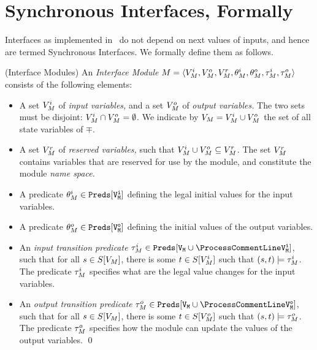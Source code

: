 \section{Synchronous Interfaces, Formally}
Interfaces as implemented in \chai \ do not depend on next values
of inputs, and hence are termed Synchronous Interfaces. We
formally define them as follows.

\begin{defi}{(Interface Modules)}
An {\em Interface Module\/} $M = \langle {V}^i_M, { V}^o_M,
{ V}^r_M, \theta^i_M, \theta^o_M, \tau^i_M, \tau^o_M \rangle$
consists of the following elements:

\begin{itemize}

\item A set ${ V}^i_M$ of {\em input variables,} and a set
${ V}^o_M$ of {\em output variables.} The two sets must be
disjoint: ${ V}^i_M \cap {V}^o_M = \emptyset$. We indicate
by ${ V}_M = { V}^i_M \cup {V}^o_M$ the set of all state
variables of $\mp$.

\item A set ${ V}^r_M$ of {\em reserved variables,} such that
${ V}^i_M \cup {V}^o_M \subseteq {V}^r_M$. The set
${ V}^r_M$ contains variables that are reserved for use by the
module, and constitute the module {\em name space.}

\item A predicate $\theta^i_M \in \tt{Preds}[{ V}^i_M]$ defining the
legal initial values for the input variables.

\item A predicate $\theta^o_M \in \tt{Preds}[{ V}^o_M]$ defining the
initial values of the output variables.

\item An {\em input transition predicate\/} $\itrans_\mp \in
\Preds[\vars_\mp \union \nx{\ivars_\mp}]$, such that for all $s
\in {S}[{ V}_M]$, there is some $t \in {S}[{ V}^i_M]$
such that $(s,t) \models \tau^i_M$. The predicate $\tau^i_M$
specifies what are the legal value changes for the input
variables.

\item An {\em output transition predicate\/} $\otrans_\mp \in
\Preds[\vars_\mp \union \nx{\ovars_\mp}]$, such that for all $s
\in {S}[{ V}_M]$, there is some $t \in {S}[{ V}^o_M]$
such that $(s,t) \models \tau^o_M$. The predicate $\tau^o_M$
specifies how the module can update the values of the output
variables. \qed
\end{itemize}
\end{defi}

